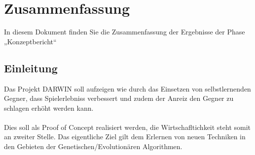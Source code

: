 \section{Zusammenfassung}
In diesem Dokument finden Sie die Zusammenfassung der Ergebnisse der Phase „Konzeptbericht“

\subsection{Einleitung}
Das Projekt DARWIN soll aufzeigen wie durch das Einsetzen von selbstlernenden Gegner, dass Spielerlebniss verbessert und zudem der Anreiz den Gegner zu schlagen erhöht werden kann. 
\\ \\ 
Dies soll als Proof of Concept realisiert werden, die Wirtschafltichkeit steht somit an zweiter Stelle. Das eigentliche Ziel gilt dem Erlernen von neuen Techniken in den Gebieten der Genetischen/Evolutionären Algorithmen.  
